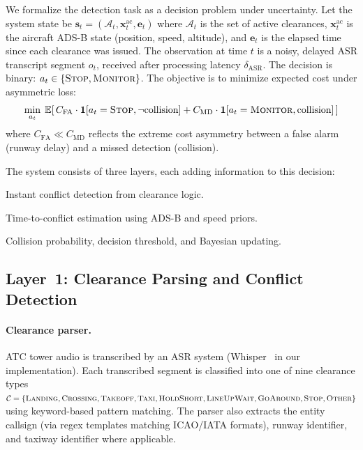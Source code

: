 \documentclass[11pt,a4paper]{article}
\begin{document}
We formalize the detection task as a decision problem under uncertainty.
Let the system state be $\mathbf{s}_t = (\mathcal{A}_t, \mathbf{x}_t^{\mathrm{ac}}, \mathbf{e}_t)$ where $\mathcal{A}_t$ is the set of active clearances, $\mathbf{x}_t^{\mathrm{ac}}$ is the aircraft ADS-B state (position, speed, altitude), and $\mathbf{e}_t$ is the elapsed time since each clearance was issued.
The observation at time $t$ is a noisy, delayed ASR transcript segment $o_t$, received after processing latency $\delta_{\mathrm{ASR}}$.
The decision is binary: $a_t \in \{\textsc{Stop}, \textsc{Monitor}\}$.
The objective is to minimize expected cost under asymmetric loss:
\begin{equation}
    \min_{a_t} \; \mathbb{E}\!\left[\, C_{\mathrm{FA}} \cdot \mathbf{1}[a_t = \textsc{Stop}, \neg\text{collision}] + C_{\mathrm{MD}} \cdot \mathbf{1}[a_t = \textsc{Monitor}, \text{collision}] \,\right]
    \label{eq:objective}
\end{equation}
where $C_{\mathrm{FA}} \ll C_{\mathrm{MD}}$ reflects the extreme cost asymmetry between a false alarm (runway delay) and a missed detection (collision).

The system consists of three layers, each adding information to this decision:
\begin{description}[nosep]
    \item[Layer~1 (Boolean):] Instant conflict detection from clearance logic.
    \item[Layer~2 (Temporal):] Time-to-conflict estimation using ADS-B and speed priors.
    \item[Layer~3 (Probabilistic):] Collision probability, decision threshold, and Bayesian updating.
\end{description}

\subsection{Layer~1: Clearance Parsing and Conflict Detection}
\label{sec:layer1}

\paragraph{Clearance parser.}
ATC tower audio is transcribed by an ASR system (Whisper~\citep{radford2023whisper} in our implementation).
Each transcribed segment is classified into one of nine clearance types $\mathcal{C} = \{\textsc{Landing}, \textsc{Crossing}, \textsc{Takeoff}, \textsc{Taxi}, \textsc{HoldShort}, \textsc{LineUpWait}, \textsc{GoAround}, \textsc{Stop}, \textsc{Other}\}$ using keyword-based pattern matching.
The parser also extracts the entity callsign (via regex templates matching ICAO/IATA formats), runway identifier, and taxiway identifier where applicable.
\end{document}
